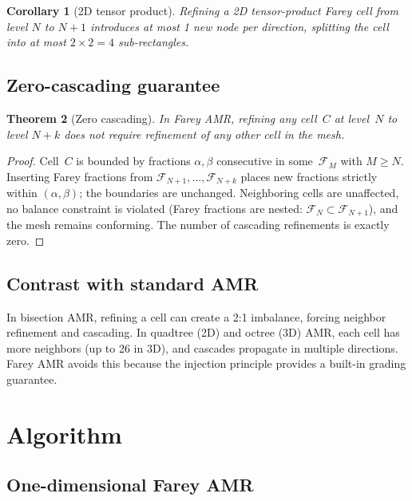 \documentclass[11pt]{article}
\newtheorem{theorem}{Theorem}[section]
\newtheorem{corollary}[theorem]{Corollary}
\theoremstyle{definition}
\newcommand{\F}{\mathcal{F}}
\begin{document}
\begin{corollary}[2D tensor product]
Refining a 2D tensor-product Farey cell from level $N$ to $N+1$
introduces at most 1 new node per direction, splitting the cell into
at most $2 \times 2 = 4$ sub-rectangles.
\end{corollary}

\subsection{Zero-cascading guarantee}

\begin{theorem}[Zero cascading]\label{thm:zero-cascade}
In Farey AMR, refining any cell~$C$ at level~$N$ to level $N+k$
does not require refinement of any other cell in the mesh.
\end{theorem}

\begin{proof}
Cell~$C$ is bounded by fractions $\alpha, \beta$ consecutive in
some~$\F_M$ with $M \ge N$. Inserting Farey fractions from
$\F_{N+1}, \ldots, \F_{N+k}$ places new fractions strictly within
$(\alpha, \beta)$; the boundaries are unchanged. Neighboring cells
are unaffected, no balance constraint is violated (Farey fractions
are nested: $\F_N \subset \F_{N+1}$), and the mesh remains
conforming. The number of cascading refinements is exactly zero.
\end{proof}

\subsection{Contrast with standard AMR}

In bisection AMR, refining a cell can create a 2:1 imbalance,
forcing neighbor refinement and cascading. In quadtree (2D) and
octree (3D) AMR, each cell has more neighbors (up to 26 in 3D),
and cascades propagate in multiple directions. Farey AMR avoids
this because the injection principle provides a built-in grading
guarantee.


\section{Algorithm}\label{sec:algorithm}

\subsection{One-dimensional Farey AMR}
\end{document}
